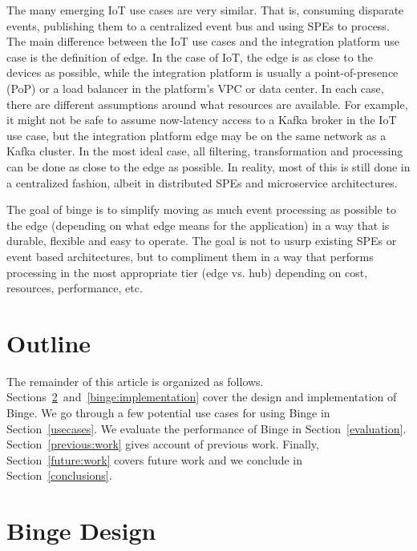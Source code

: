 \documentclass[10pt,twocolumn]{article}
\begin{document}
The many emerging IoT use cases are very similar.  That is, consuming disparate
events, publishing them to a centralized event bus and using SPEs to process.
The main difference between the IoT use cases and the integration platform use
case is the definition of edge.  In the case of IoT, the edge is as close to
the devices as possible, while the integration platform is usually a
point-of-presence (PoP) or a load balancer in the platform's VPC or data
center.   In each case, there are different assumptions around what resources
are available.  For example, it might not be safe to assume now-latency access
to a Kafka broker in the IoT use case, but the integration platform edge may be
on the same network as a Kafka cluster.  In the most ideal case, all filtering,
transformation and processing can be done as close to the edge as possible.  In
reality, most of this is still done in a centralized fashion, albeit in
distributed SPEs and microservice architectures.

The goal of binge is to simplify moving as much event processing as possible to
the edge (depending on what edge means for the application) in a way that is
durable, flexible and easy to operate.  The goal is not to usurp existing SPEs
or event based architectures, but to compliment them in a way that performs
processing in the most appropriate tier (edge vs. hub) depending on cost,
resources, performance, etc.

\section{Outline}
The remainder of this article is organized as follows.
Sections~\ref{binge:design}~and~\ref{binge:implementation} cover the design and
implementation of Binge.  We go through a few potential use cases for using
Binge in Section~\ref{usecases}.  We evaluate the performance of Binge in
Section~\ref{evaluation}.  Section~\ref{previous:work} gives account of
previous work.  Finally, Section~\ref{future:work} covers future work and we
conclude in Section~\ref{conclusions}.

\section{Binge Design}\label{binge:design}
\end{document}
